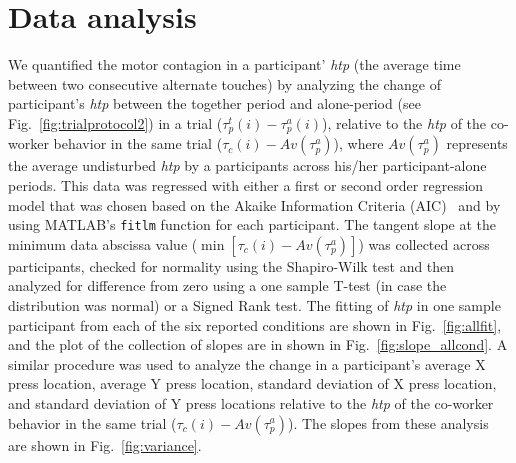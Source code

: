 \section{Data analysis} \label{data_analysis}

We quantified the motor contagion in a participant' {\it htp} (the average time between two consecutive alternate touches) by analyzing the change of participant's {\it htp} between the together period and alone-period (see Fig.~\ref{fig:trialprotocol2}) in a trial ($\tau_p^t(i)-\tau_p^a(i)$), relative to the {\it htp} of the co-worker behavior in the same trial ($\tau_c (i)-Av(\tau_p^a)$), where $Av(\tau_p^a)$ represents the average undisturbed {\it htp} by a participants across his/her participant-alone periods. This data was regressed with either a first or second order regression model that was chosen based on the Akaike Information Criteria (AIC)~\cite{Akaike:ISIT:1973} and by using MATLAB's {\tt fitlm} function for each participant. The tangent slope at the minimum data abscissa value ($\min[\tau_c(i)-Av(\tau_p^a)]$) was collected across participants, checked for normality using the Shapiro-Wilk test and then analyzed for difference from zero using a one sample T-test (in case the distribution was normal) or a Signed Rank test. The fitting of {\it htp} in one sample participant from each of the six reported conditions are shown in Fig.~\ref{fig:allfit}, and the plot of the collection of slopes are in shown in Fig.~\ref{fig:slope_allcond}. A similar procedure was used to analyze the change in a participant's average X press location, average Y press location, standard deviation of X press location, and standard deviation of Y press locations relative to the {\it htp} of the co-worker behavior in the same trial ($\tau_c(i)-Av(\tau_p^a)$). The slopes from these analysis are shown in Fig.~\ref{fig:variance}.

